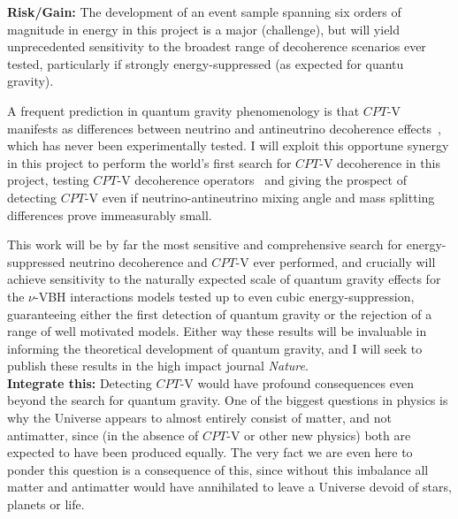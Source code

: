\documentclass[a4paper,11pt]{article}
\begin{document}
\textbf{Risk/Gain:} The development of an event sample spanning six orders of magnitude in energy in this project is a major (challenge), but will yield unprecedented sensitivity to the broadest range of decoherence scenarios ever tested, particularly if strongly energy-suppressed (as expected for quantu gravity).


A frequent prediction in quantum gravity phenomenology is that $CPT$-V manifests as differences between neutrino and antineutrino decoherence effects~\cite{Mavromatos_2009, Barenboim:2004wu, Carrasco:2018sca, Buoninfante:2020iyr, Capolupo:2020myw}, which has never been experimentally tested. I will exploit this opportune synergy in this project  to perform the world's first search for $CPT$-V decoherence in this project, testing $CPT$-V decoherence operators~\cite{Carrasco:2018sca, Buoninfante:2020iyr, Capolupo:2020myw} and giving the prospect of detecting $CPT$-V even if neutrino-antineutrino mixing angle and mass splitting differences prove immeasurably small.

This work will be by far the most sensitive and comprehensive search for energy-suppressed neutrino decoherence and $CPT$-V ever performed, and crucially will achieve sensitivity to the naturally expected scale of quantum gravity effects for the $\nu$-VBH interactions models tested up to even cubic energy-suppression, guaranteeing either the first detection of quantum gravity or the rejection of a range of well motivated models. Either way these results will be invaluable in informing the theoretical development of quantum gravity, and I will seek to publish these results in the high impact journal \textit{Nature}. \\

\textbf{Integrate this:} Detecting $CPT$-V would have profound consequences even beyond the search for quantum gravity. One of the biggest questions in physics is why the Universe appears to almost entirely consist of matter, and not antimatter, since (in the absence of $CPT$-V or other new physics) both are expected to have been produced equally. The very fact we are even here to ponder this question is a consequence of this, since without this imbalance all matter and antimatter would have annihilated to leave a Universe devoid of stars, planets or life. 
\end{document}
